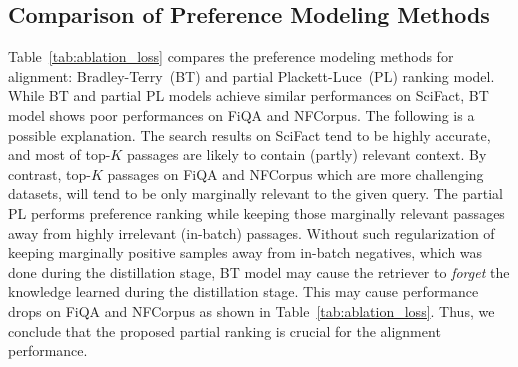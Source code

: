 \subsection{Comparison of Preference Modeling Methods}

Table~\ref{tab:ablation_loss} compares the preference modeling methods for alignment:  Bradley-Terry~(BT) \cite{bradley1952rank} and partial Plackett-Luce~(PL) ranking model. While BT and partial PL models achieve similar performances on SciFact, BT model shows poor performances on FiQA and NFCorpus. The following is a possible explanation. The search results on SciFact tend to be highly accurate, and most of top-$K$ passages are likely to contain (partly) relevant context. By contrast, top-$K$ passages on FiQA and NFCorpus which are more challenging datasets, will tend to be only marginally relevant to the given query. The partial PL performs preference ranking while keeping those marginally relevant passages away from highly irrelevant (in-batch) passages. Without such regularization of keeping marginally positive samples away from in-batch negatives, which was done during the distillation stage, BT model may cause the retriever to \emph{forget} the knowledge learned during the distillation stage. This may cause performance drops on FiQA and NFCorpus as shown in Table~\ref{tab:ablation_loss}. Thus, we conclude that the proposed partial ranking is crucial for the alignment performance. 

